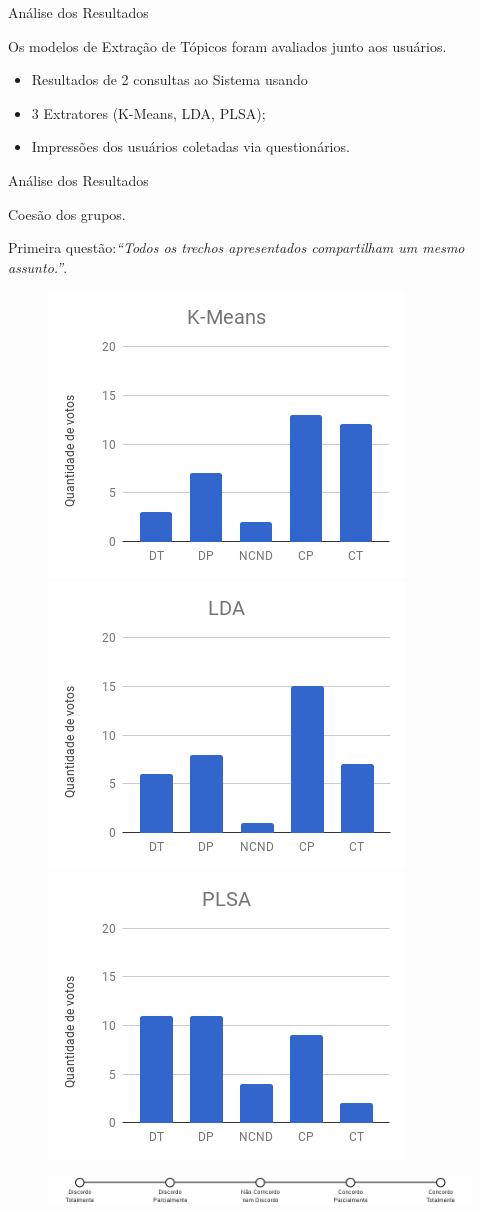 \documentclass[xcolor=dvipsnames]{beamer}
\begin{document}
\begin{frame}{Análise dos Resultados}

Os modelos de Extração de Tópicos foram avaliados junto aos usuários.


\begin{itemize}
	\item Resultados de 2 consultas ao Sistema usando 
	\item 3 Extratores (K-Means, LDA, PLSA);
	\item Impressões dos usuários coletadas via questionários.
\end{itemize}

\end{frame}









\begin{frame}{Análise dos Resultados}

	Coesão dos grupos.

	Primeira questão:\textit{``Todos os trechos apresentados compartilham um mesmo assunto.''}. %
\begin{figure}[!h] \centering     %
		\includegraphics[width=.31\textwidth]{images/figuras-experimento/Q1-KMeans.png}
		\includegraphics[width=.31\textwidth]{images/figuras-experimento/Q1-LDA.png}
		\includegraphics[width=.31\textwidth]{images/figuras-experimento/Q1-PLSA.png}
	\label{fig:Q1}
\end{figure}


\begin{figure}[!h] \centering     %
	\includegraphics[width=.9\textwidth]{images/likert.png}
\end{figure}


\end{frame}
\end{document}
